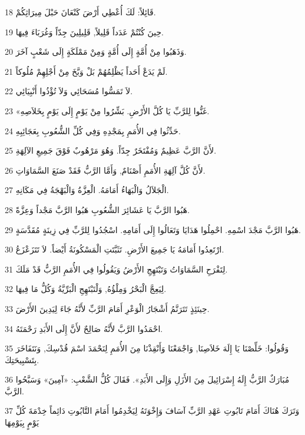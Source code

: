 \par 18 قَائِلاً: لَكَ أُعْطِي أَرْضَ كَنْعَانَ حَبْلَ مِيرَاثِكُمْ.
\par 19 حِينَ كُنْتُمْ عَدَداً قَلِيلاً, قَلِيلِينَ جِدّاً وَغُرَبَاءَ فِيهَا.
\par 20 وَذَهَبُوا مِنْ أُمَّةٍ إِلَى أُمَّةٍ وَمِنْ مَمْلَكَةٍ إِلَى شَعْبٍ آخَرَ.
\par 21 لَمْ يَدَعْ أَحَداً يَظْلِمُهُمْ بَلْ وَبَّخَ مِنْ أَجْلِهِمْ مُلُوكاً.
\par 22 لاَ تَمَسُّوا مُسَحَائِي وَلاَ تُؤْذُوا أَنْبِيَائِي.
\par 23 «غَنُّوا لِلرَّبِّ يَا كُلَّ الأَرْضِ. بَشِّرُوا مِنْ يَوْمٍ إِلَى يَوْمٍ بِخَلاَصِهِ.
\par 24 حَدِّثُوا فِي الأُمَمِ بِمَجْدِهِ وَفِي كُلِّ الشُّعُوبِ بِعَجَائِبِهِ.
\par 25 لأَنَّ الرَّبَّ عَظِيمٌ وَمُفْتَخَرٌ جِدّاً. وَهُوَ مَرْهُوبٌ فَوْقَ جَمِيعِ الآلِهَةِ.
\par 26 لأَنَّ كُلَّ آلِهَةِ الأُمَمِ أَصْنَامٌ, وَأَمَّا الرَّبُّ فَقَدْ صَنَعَ السَّمَاوَاتِ.
\par 27 الْجَلاَلُ وَالْبَهَاءُ أَمَامَهُ. الْعِزَّةُ وَالْبَهْجَةُ فِي مَكَانِهِ.
\par 28 هَبُوا الرَّبَّ يَا عَشَائِرَ الشُّعُوبِ هَبُوا الرَّبَّ مَجْداً وَعِزَّةً.
\par 29 هَبُوا الرَّبَّ مَجْدَ اسْمِهِ. احْمِلُوا هَدَايَا وَتَعَالُوا إِلَى أَمَامِهِ. اسْجُدُوا لِلرَّبِّ فِي زِينَةٍ مُقَدَّسَةٍ.
\par 30 ارْتَعِدُوا أَمَامَهُ يَا جَمِيعَ الأَرْضِ. تَثَبَّتَتِ الْمَسْكُونَةُ أَيْضاً. لاَ تَتَزَعْزَعُ.
\par 31 لِتَفْرَحِ السَّمَاوَاتُ وَتَبْتَهِجِ الأَرْضُ وَيَقُولُوا فِي الأُمَمِ الرَّبُّ قَدْ مَلَكَ.
\par 32 لِيَعِجَّ الْبَحْرُ وَمِلْؤُهُ, وَلْتَبْتَهِجِ الْبَرِّيَّةُ وَكُلُّ مَا فِيهَا.
\par 33 حِينَئِذٍ تَتَرَنَّمُ أَشْجَارُ الْوَعْرِ أَمَامَ الرَّبِّ لأَنَّهُ جَاءَ لِيَدِينَ الأَرْضَ.
\par 34 احْمَدُوا الرَّبَّ لأَنَّهُ صَالِحٌ لأَنَّ إِلَى الأَبَدِ رَحْمَتَهُ.
\par 35 وَقُولُوا: خَلِّصْنَا يَا إِلَهَ خَلاَصِنَا, وَاجْمَعْنَا وَأَنْقِذْنَا مِنَ الأُمَمِ لِنَحْمَدَ اسْمَ قُدْسِكَ, وَنَتَفَاخَرَ بِتَسْبِيحَتِكَ.
\par 36 مُبَارَكٌ الرَّبُّ إِلَهُ إِسْرَائِيلَ مِنَ الأَزَلِ وَإِلَى الأَبَدِ». فَقَالَ كُلُّ الشَّعْبِ: «آمِينَ» وَسَبَّحُوا الرَّبَّ.
\par 37 وَتَرَكَ هُنَاكَ أَمَامَ تَابُوتِ عَهْدِ الرَّبِّ آسَافَ وَإِخْوَتَهُ لِيَخْدِمُوا أَمَامَ التَّابُوتِ دَائِماً خِدْمَةَ كُلِّ يَوْمٍ بِيَوْمِهَا

